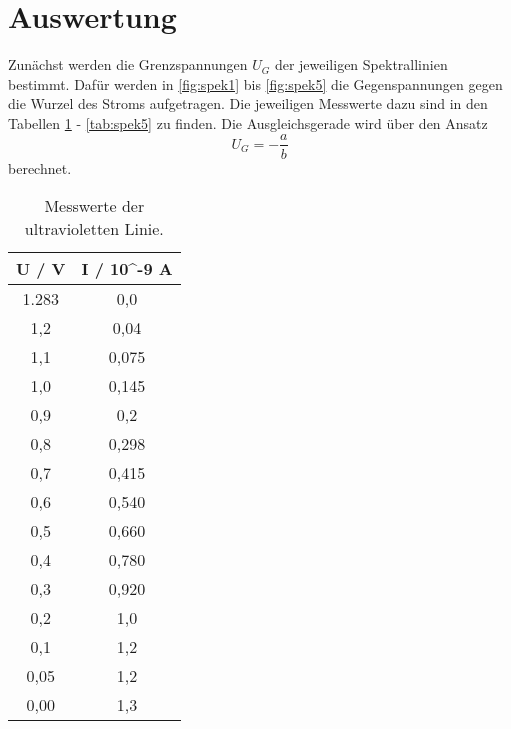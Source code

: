 \section{Auswertung}
\label{sec:Auswertung}

Zunächst werden die Grenzspannungen $U_G$ der jeweiligen Spektrallinien bestimmt.
Dafür werden in \autoref{fig:spek1} bis \autoref{fig:spek5} die Gegenspannungen gegen die Wurzel des Stroms aufgetragen.
Die jeweiligen Messwerte dazu sind in den Tabellen \ref{tab:spek1} - \ref{tab:spek5} zu finden.
Die Ausgleichsgerade wird über den Ansatz 
\begin{equation*}
  U_G = - \frac{a}{b}
\end{equation*}
berechnet.

\begin{table}
  \centering
  \caption{Messwerte der ultravioletten Linie.}
  \label{tab:spek1}
  \begin{tabular}{c c}
    \toprule
    U / V & I / 10\textasciicircum -9 A \\
    \midrule
    1.283 &         0,0 \\
      1,2 &        0,04 \\
      1,1 &       0,075 \\
      1,0 &       0,145 \\
      0,9 &         0,2 \\
      0,8 &       0,298 \\
      0,7 &       0,415 \\
      0,6 &       0,540 \\
      0,5 &       0,660 \\
      0,4 &       0,780 \\
      0,3 &       0,920 \\
      0,2 &         1,0 \\
      0,1 &         1,2 \\
     0,05 &         1,2 \\
     0,00 &         1,3 \\
    \bottomrule
  \end{tabular}
\end{table}

